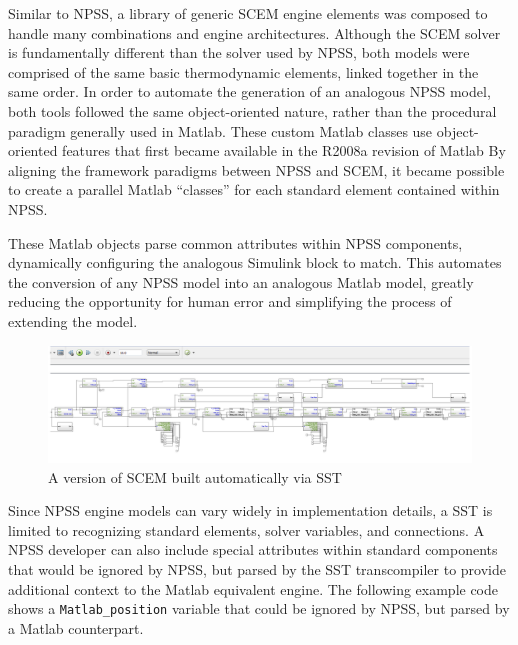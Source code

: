 \documentclass[heading.tex]{subfiles}
\begin{document}
Similar to NPSS, a library of generic SCEM engine elements was composed to handle many combinations and
engine architectures. Although the SCEM solver is fundamentally different than the solver used by NPSS,
both models were comprised of the same basic thermodynamic elements, linked together in the same order. 
In order to automate the generation of an analogous NPSS model,
both tools followed the same object-oriented nature, rather than the procedural paradigm generally used in Matlab. 
These custom Matlab classes use object-oriented features that first became
available in the R2008a revision of Matlab\cite{MatlabOOP}
By aligning the framework paradigms between NPSS and SCEM,
it became possible to create a parallel Matlab ``classes'' for each standard element contained within NPSS.

These Matlab objects parse common attributes within NPSS components,
dynamically configuring the analogous Simulink block to match.
This automates the conversion of any NPSS model into an analogous Matlab model,
greatly reducing the opportunity for human error and simplifying the process of extending the model.

\begin{figure}[H]
\centering
 \begin{adjustwidth}{-3cm}{-2cm}
\includegraphics[width=1.4\textwidth]{images/VCE5screencap}
\end{adjustwidth} 
\caption{A version of SCEM built automatically via SST}
\label{f:sstSCEM}

\end{figure}

Since NPSS engine models can vary widely in implementation details, a SST is limited to recognizing
standard elements, solver variables, and connections.
A NPSS developer can also include special attributes within standard components that would be
ignored by NPSS, but parsed by the SST transcompiler to provide additional context to the
Matlab equivalent engine. The following example code shows a \texttt{Matlab\_position} variable
that could be ignored by NPSS, but parsed by a Matlab counterpart.

\begin{adjustwidth}{-0.5cm}{-0.5cm}
 \inputminted[]{c++}{code/parser}
 \end{adjustwidth} 
\end{document}
